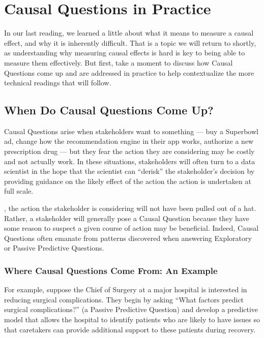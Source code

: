 \documentclass[letterpaper,10pt,english]{jupyterBook}
\begin{document}
\chapter{Causal Questions in Practice}
\label{\detokenize{30_questions/40_causal_questions_application:causal-questions-in-practice}}\label{\detokenize{30_questions/40_causal_questions_application::doc}}
\sphinxAtStartPar
In our last reading, we learned a little about what it means to measure a causal effect, and why it is inherently difficult. That is a topic we will return to shortly, as understanding why measuring causal effects is hard is key to being able to measure them effectively. But first, take a moment to discuss how Causal Questions come up and are addressed in practice to help contextualize the more technical readings that will follow.




\section{When Do Causal Questions Come Up?}
\label{\detokenize{30_questions/40_causal_questions_application:when-do-causal-questions-come-up}}
\sphinxAtStartPar
Causal Questions arise when stakeholders want to  something — buy a Superbowl ad, change how the recommendation engine in their app works, authorize a new prescription drug — but they fear the action they are considering may be costly and not actually work. In these situations, stakeholders will often turn to a data scientist in the hope that the scientist can “de\sphinxhyphen{}risk” the stakeholder’s decision by providing guidance on the likely effect of the action  the action is undertaken at full scale.

\sphinxAtStartPar
{}, the action the stakeholder is considering will not have been pulled out of a hat. Rather, a stakeholder will generally pose a Causal Question because they have some reason to suspect a given course of action may be beneficial. Indeed, Causal Questions often emanate from patterns discovered when answering Exploratory or Passive Predictive Questions.


\subsection{Where Causal Questions Come From: An Example}
\label{\detokenize{30_questions/40_causal_questions_application:where-causal-questions-come-from-an-example}}
\sphinxAtStartPar
For example, suppose the Chief of Surgery at a major hospital is interested in reducing surgical complications. They begin by asking “What factors predict surgical complications?” (a Passive Predictive Question) and develop a predictive model that allows the hospital to identify patients who are likely to have issues so that caretakers can provide additional support to these patients during recovery.
\end{document}
